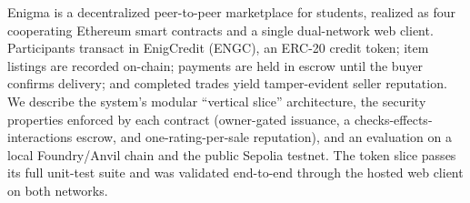 Enigma is a decentralized peer-to-peer marketplace for students, realized as four cooperating Ethereum smart contracts and a single dual-network web client. Participants transact in EnigCredit (ENGC), an ERC-20 credit token; item listings are recorded on-chain; payments are held in escrow until the buyer confirms delivery; and completed trades yield tamper-evident seller reputation. We describe the system's modular ``vertical slice'' architecture, the security properties enforced by each contract (owner-gated issuance, a checks-effects-interactions escrow, and one-rating-per-sale reputation), and an evaluation on a local Foundry/Anvil chain and the public Sepolia testnet. The token slice passes its full unit-test suite and was validated end-to-end through the hosted web client on both networks.
